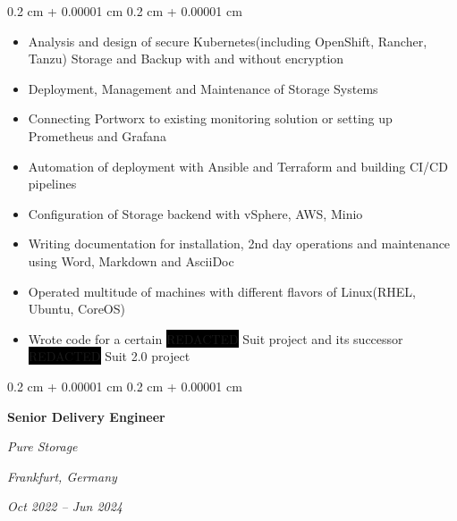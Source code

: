 \documentclass[10pt, letterpaper]{article}
\newenvironment{highlights}{
  \begin{itemize}[
        topsep=0.10 cm,
        parsep=0.10 cm,
        partopsep=0pt,
        itemsep=0pt,
        leftmargin=0.4 cm + 10pt
      ]
    }{
  \end{itemize}
} %
\newenvironment{onecolentry}{
  \begin{adjustwidth}{
      0.2 cm + 0.00001 cm
    }{
      0.2 cm + 0.00001 cm
    }
  }{
  \end{adjustwidth}
} %
\newenvironment{twocolentry}[2][]{
  \onecolentry
  \def\secondColumn{#2}
  \setcolumnwidth{\fill, 4.5 cm}
  \begin{paracol}{2}
  }{
    \switchcolumn \raggedleft \secondColumn
  \end{paracol}
  \endonecolentry
} %
\begin{document}
\vspace{0.2 cm}

\begin{onecolentry}
	\begin{highlights}
		\item  Analysis and design of secure Kubernetes(including
		OpenShift, Rancher, Tanzu) Storage and Backup with and without encryption
		\item  Deployment, Management and Maintenance of Storage Systems
		\item  Connecting Portworx to existing monitoring solution or
		setting up Prometheus and Grafana
		\item  Automation of deployment with Ansible and Terraform and
		building CI/CD pipelines
		\item  Configuration of Storage backend with vSphere, AWS, Minio
		\item  Writing documentation for installation, 2nd day operations
		and maintenance using Word, Markdown and AsciiDoc
		\item  Operated multitude of machines with different flavors of Linux(RHEL, Ubuntu, CoreOS)
		\item  Wrote code for a certain \color{white}\colorbox{black}{REDACTED}\color{black} Suit project and its successor \color{white}\colorbox{black}{REDACTED}\color{black} Suit 2.0 project 
	\end{highlights}
\end{onecolentry}

\vspace{0.3 cm}

\begin{twocolentry}{
    \textit{Frankfurt, Germany}

  \textit{Oct 2022 – Jun 2024}}
  \textbf{Senior Delivery Engineer}

  \textit{Pure Storage}
\end{twocolentry}

\vspace{0.2 cm}
\end{document}
